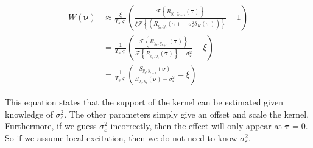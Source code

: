 \documentclass[]{article}
\begin{document}
\begin{align}
	W\left(\boldsymbol{\nu}\right) &\approx \frac{\xi}{T_s \varsigma} \left(\frac{\mathcal{F}\left\{R_{y_{t},y_{t+1}}(\boldsymbol{\tau})\right\}}{\xi\mathcal{F}\left\{\left( R_{y_{t},y_{t}}(\boldsymbol{\tau}) - \sigma_{\varepsilon}^2\delta_K\left(\boldsymbol{\tau}\right) \right)\right\}} - 1\right)  \\
	&= \frac{1}{T_s \varsigma} \left(\frac{\mathcal{F}\left\{R_{y_{t},y_{t+1}}(\boldsymbol{\tau})\right\}}{\mathcal{F}\left\{ R_{y_{t},y_{t}}(\boldsymbol{\tau})\right\} - \sigma_{\varepsilon}^2 } - \xi\right) \\
	&= \frac{1}{T_s \varsigma} \left(\frac{S_{y_{t},y_{t+1}}\left(\boldsymbol{\nu}\right)}{S_{y_{t},y_{t}}\left(\boldsymbol{\nu}\right) - \sigma_{\varepsilon}^2 } - \xi\right)
\end{align}

This equation states that the support of the kernel can be estimated given knowledge of $\sigma_\varepsilon^2$. The other parameters simply give an offset and scale the kernel. Furthermore, if we guess $\sigma_\varepsilon^2$ incorrectly, then the effect will only appear at $\boldsymbol{\tau}=0$. So if we assume local excitation, then we do not need to know $\sigma_\varepsilon^2$.\\


% 
% 
\end{document}
